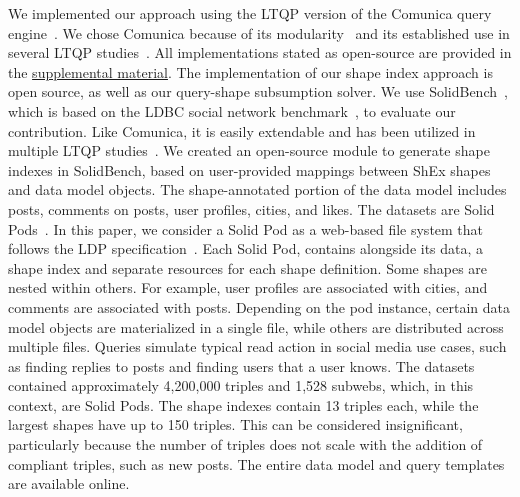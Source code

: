 We implemented our approach using the LTQP version of the Comunica query engine~\cite{taelman_iswc_resources_comunica_2018}.
We chose Comunica because of its modularity~\cite{taelman_swj_componentsjs_2022} and its established use in several LTQP studies~\cite{Bogaerts2021LinkTW, Taelman2023, eschauzier_quweda_linkqueue_2023, Hanski2024, eschauzier_amw_rcubemetric_2024, tam2024opportunitiesshapebasedoptimizationlink}.
All implementations stated as open-source are provided in the \hyperref[sec:supplementalMaterial]{supplemental material}.
The implementation of our shape index approach is open source, as well as our query-shape subsumption solver.
We use SolidBench~\cite{Taelman2023}, which is based on the LDBC social network benchmark~\cite{Angles2020}, to evaluate our contribution.
Like Comunica, it is easily extendable and has been utilized in multiple LTQP studies~\cite{Bogaerts2021LinkTW, Taelman2023, eschauzier_quweda_linkqueue_2023, Hanski2024, eschauzier_amw_rcubemetric_2024, tam2024opportunitiesshapebasedoptimizationlink}.
We created an open-source module to generate shape indexes in SolidBench, based on user-provided mappings between ShEx shapes and data model objects.
The shape-annotated portion of the data model includes posts, comments on posts, user profiles, cities, and likes.
The datasets are Solid Pods~\cite{sambra_solid_2016, dedecker2022s}.
In this paper, we consider a Solid Pod as a web-based file system that follows the LDP specification~\cite{w3LinkedData}.
Each Solid Pod, contains alongside its data, a shape index and separate resources for each shape definition.
Some shapes are nested within others. 
For example, user profiles are associated with cities, and comments are associated with posts.
Depending on the pod instance, certain data model objects are materialized in a single file, while others are distributed across multiple files.
Queries simulate typical read action in social media use cases, such as finding replies to posts and finding users that a user knows.
The datasets contained approximately 4,200,000 triples and 1,528 subwebs, which, in this context, are Solid Pods.
The shape indexes contain 13 triples each, while the largest shapes have up to 150 triples. 
This can be considered insignificant, particularly because the number of triples does not scale with the addition of compliant triples, such as new posts.
The entire data model and query templates are available online.~

